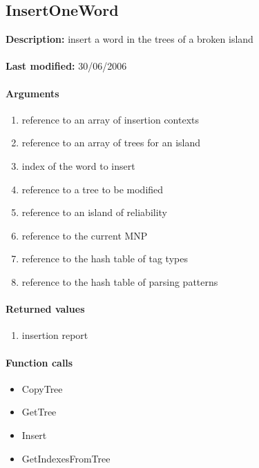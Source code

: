 \subsection{InsertOneWord}
\textbf{Description:} insert a word in the trees of a broken island\\
\\\textbf{Last modified:} 30/06/2006

\paragraph{Arguments}
\begin{enumerate}
\item reference to an array of insertion contexts
\item reference to an array of trees for an island
\item index of the word to insert
\item reference to a tree to be modified
\item reference to an island of reliability
\item reference to the current MNP
\item reference to the hash table of tag types
\item reference to the hash table of parsing patterns
\end{enumerate}

\paragraph{Returned values}
\begin{enumerate}
\item insertion report
\end{enumerate}

\paragraph{Function calls}
\begin{itemize}
\item CopyTree
\item GetTree
\item Insert
\item GetIndexesFromTree
\end{itemize}

